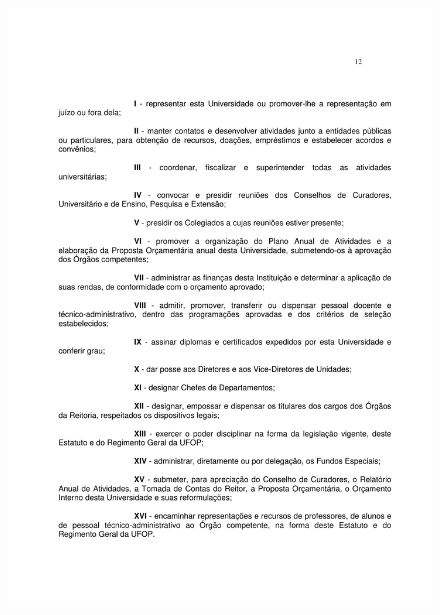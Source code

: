 \begin{figure}[p]
	\centering 
	\includegraphics[scale=0.7]{capitulos/resolucoes/cuni414/cuni414-12.pdf}
\end{figure}

